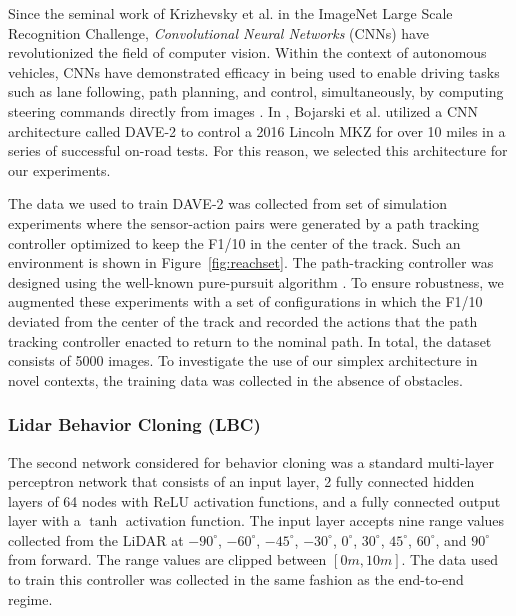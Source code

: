 \documentclass[manuscript,screen,review]{acmart}
\newcommand{\figref}[1]{Figure~\ref{#1}}
\begin{document}
Since the seminal work of Krizhevsky et al. \cite{AlexNet2012} in the ImageNet Large Scale Recognition Challenge, \emph{Convolutional Neural Networks} (CNNs) have revolutionized the field of computer vision. Within the context of autonomous vehicles, CNNs have demonstrated efficacy in being used to enable driving tasks such as lane following, path planning, and control, simultaneously, by computing steering commands directly from images \cite{DeepDrive2015}. In \cite{bojarski2016end}, Bojarski et al. utilized a CNN architecture called DAVE-2 to control a 2016 Lincoln MKZ for over 10 miles in a series of successful on-road tests. For this reason, we selected this architecture for our experiments. 

The data we used to train DAVE-2 was collected from set of simulation experiments where the sensor-action pairs were generated by a path tracking controller optimized to keep the F1/10 in the center of the track. Such an environment is shown in \figref{fig:reachset}. The path-tracking controller was designed using the well-known pure-pursuit algorithm \cite{coulter1992implementation}. To ensure robustness, we augmented these experiments with a set of configurations in which the F1/10 deviated from the center of the track and recorded the actions that the path tracking controller enacted to return to the nominal path. In total, the dataset consists of 5000 images.  To investigate the use of our simplex architecture in novel contexts, the training data was collected in the absence of obstacles.
 



\subsubsection{Lidar Behavior Cloning (LBC)}
\label{sec:lidar cloning}
The second network considered for behavior cloning was a standard multi-layer perceptron network that consists of an input layer, 2 fully connected hidden layers of 64 nodes with ReLU activation functions, and a fully connected output layer with a $\tanh$ activation function. The input layer accepts nine range values collected from the LiDAR at $-90^{\circ}$, $-60^{\circ}$, $-45^{\circ}$, $-30^{\circ}$, $0^{\circ}$, $30^{\circ}$, $45^{\circ}$, $60^{\circ}$, and $90^{\circ}$ from forward. The range values are clipped between $[0m, 10m]$. The data used to train this controller was collected in the same fashion as the end-to-end regime. 
\end{document}

